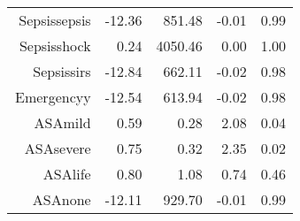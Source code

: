 \begin{tabular}{rrrrr}
$$  Sepsis\-sepsis & -12.36 & 851.48 & -0.01 & 0.99 \\ 
  Sepsis\-shock & 0.24 & 4050.46 & 0.00 & 1.00 \\ 
  Sepsis\-sirs & -12.84 & 662.11 & -0.02 & 0.98 \\ 
  Emergency\-y & -12.54 & 613.94 & -0.02 & 0.98 \\ 
  ASA\-mild & 0.59 & 0.28 & 2.08 & 0.04 \\ 
  ASA\-severe & 0.75 & 0.32 & 2.35 & 0.02 \\ 
  ASA\-life & 0.80 & 1.08 & 0.74 & 0.46 \\ 
  ASA\-none & -12.11 & 929.70 & -0.01 & 0.99 \\ 
   \hline
\end{tabular}

